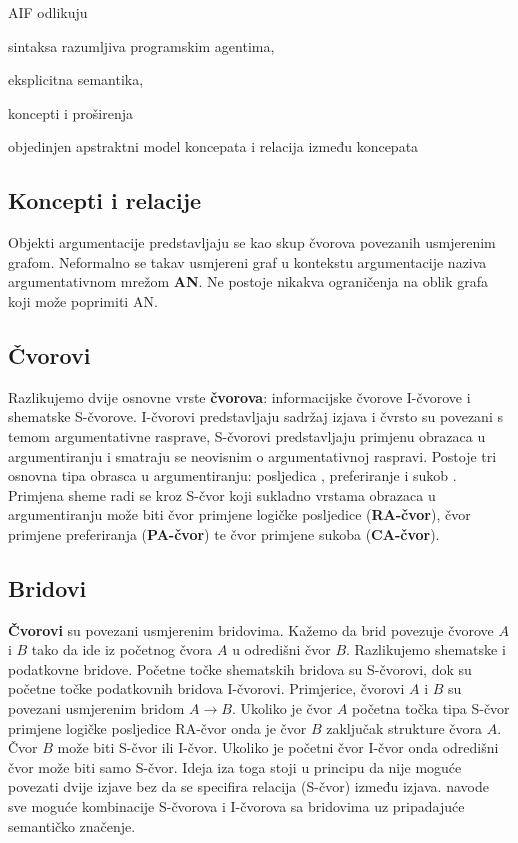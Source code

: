 AIF odlikuju 
\begin{enumerate*}
    \item sintaksa razumljiva programskim agentima,
    \item eksplicitna semantika,
    \item koncepti i proširenja 
    \item objedinjen apstraktni model koncepata i relacija između
koncepata
\end{enumerate*}

\subsection{Koncepti i relacije}

Objekti argumentacije predstavljaju se kao skup čvorova povezanih usmjerenim grafom. 
Neformalno se takav usmjereni graf u kontekstu argumentacije naziva
argumentativnom mrežom  \textbf{AN}. Ne 
postoje nikakva ograničenja na oblik grafa koji može poprimiti AN.

\subsection{Čvorovi}

Razlikujemo dvije osnovne vrste \textbf{čvorova}: informacijske čvorove
 I-čvorove i shematske  S-čvorove.
I-čvorovi predstavljaju sadržaj izjava i čvrsto su povezani s temom
argumentativne rasprave, S-čvorovi predstavljaju primjenu obrazaca u
argumentiranju i smatraju se neovisnim o argumentativnoj raspravi. Postoje tri
osnovna tipa obrasca u argumentiranju: posljedica ,
preferiranje  i sukob . Primjena sheme
radi se kroz S-čvor koji sukladno vrstama obrazaca u argumentiranju može biti
čvor primjene logičke posljedice  (\textbf{RA-čvor}), 
čvor primjene preferiranja  (\textbf{PA-čvor}) te
čvor primjene sukoba  (\textbf{CA-čvor}).

\subsection{Bridovi}

\textbf{Čvorovi} su povezani usmjerenim bridovima. Kažemo da brid povezuje čvorove $A$ i $B$
tako da ide iz početnog čvora $A$ u odredišni čvor $B$. Razlikujemo shematske i podatkovne
bridove. Početne točke shematskih bridova su S-čvorovi, dok su početne točke 
podatkovnih bridova I-čvorovi. Primjerice, čvorovi $A$ i $B$ su povezani usmjerenim bridom 
$A \rightarrow B$. Ukoliko je čvor $A$ početna točka tipa
S-čvor primjene logičke posljedice RA-čvor onda je čvor $B$ zaključak strukture
čvora $A$. Čvor $B$ može biti S-čvor ili I-čvor. Ukoliko je početni čvor I-čvor onda
odredišni čvor može biti samo S-čvor. 
Ideja iza toga stoji u principu da nije moguće povezati dvije izjave bez da se
specifira relacija (S-čvor) između izjava. 
\cite{chesnevar2006towards} navode sve moguće kombinacije S-čvorova i I-čvorova
sa bridovima uz pripadajuće semantičko značenje. 


